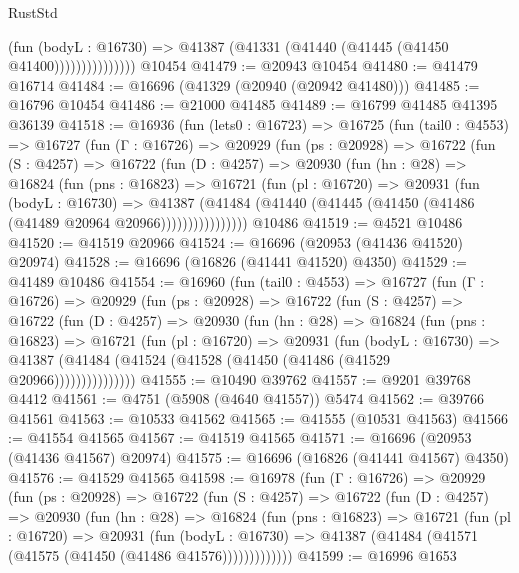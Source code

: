 \begin{lexlean}{RustStd}
\begin{coremodule}
                        (fun (bodyL : @16730) =>
                        @41387 (@41331 (@41440 (@41445 (@41450 @41400)))))))))))))))
    @10454
@41479 := @20943 @10454
@41480 := @41479 @16714
@41484 := @16696 (@41329 (@20940 (@20942 @41480)))
@41485 := @16796 @10454
@41486 := @21000 @41485
@41489 := @16799 @41485 @41395 @36139
@41518 := @16936
    (fun (lets0 : @16723) =>
    @16725
      (fun (tail0 : @4553) =>
      @16727
        (fun (Γ : @16726) =>
        @20929
          (fun (ps : @20928) =>
          @16722
            (fun (S : @4257) =>
            @16722
              (fun (D : @4257) =>
              @20930
                (fun (hn : @28) =>
                @16824
                  (fun (pns : @16823) =>
                  @16721
                    (fun (pl : @16720) =>
                    @20931
                      (fun (bodyL : @16730) =>
                      @41387
                        (@41484
                          (@41440 (@41445 (@41450 (@41486 (@41489 @20964 @20966))))))))))))))))
    @10486
@41519 := @4521 @10486
@41520 := @41519 @20966
@41524 := @16696 (@20953 (@41436 @41520) @20974)
@41528 := @16696 (@16826 (@41441 @41520) @4350)
@41529 := @41489 @10486
@41554 := @16960
    (fun (tail0 : @4553) =>
    @16727
      (fun (Γ : @16726) =>
      @20929
        (fun (ps : @20928) =>
        @16722
          (fun (S : @4257) =>
          @16722
            (fun (D : @4257) =>
            @20930
              (fun (hn : @28) =>
              @16824
                (fun (pns : @16823) =>
                @16721
                  (fun (pl : @16720) =>
                  @20931
                    (fun (bodyL : @16730) =>
                    @41387 (@41484 (@41524 (@41528 (@41450 (@41486 (@41529 @20966)))))))))))))))
@41555 := @10490 @39762
@41557 := @9201 @39768 @4412
@41561 := @4751 (@5908 (@4640 @41557)) @5474
@41562 := @39766 @41561
@41563 := @10533 @41562
@41565 := @41555 (@10531 @41563)
@41566 := @41554 @41565
@41567 := @41519 @41565
@41571 := @16696 (@20953 (@41436 @41567) @20974)
@41575 := @16696 (@16826 (@41441 @41567) @4350)
@41576 := @41529 @41565
@41598 := @16978
    (fun (Γ : @16726) =>
    @20929
      (fun (ps : @20928) =>
      @16722
        (fun (S : @4257) =>
        @16722
          (fun (D : @4257) =>
          @20930
            (fun (hn : @28) =>
            @16824
              (fun (pns : @16823) =>
              @16721
                (fun (pl : @16720) =>
                @20931
                  (fun (bodyL : @16730) =>
                  @41387 (@41484 (@41571 (@41575 (@41450 (@41486 @41576)))))))))))))
@41599 := @16996 @1653

\end{coremodule}
\end{lexlean}
